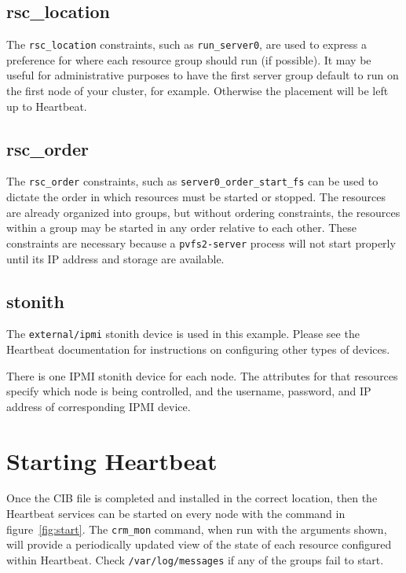 \documentclass[11pt]{article}
\begin{document}
\subsection{rsc\_location}

The \texttt{rsc\_location} constraints, such as \texttt{run\_server0},
are used to express a preference for where each resource group should
run (if possible).  It may be useful for administrative purposes to have
the first server group default to run on the first node of your cluster,
for example.  Otherwise the placement will be left up to Heartbeat.

\subsection{rsc\_order}

The \texttt{rsc\_order} constraints, such as
\texttt{server0\_order\_start\_fs} can be used to dictate the order in
which resources must be started or stopped.  The resources are already
organized into groups, but without ordering constraints, the resources
within a group may be started in any order relative to each other.
These constraints are necessary because a \texttt{pvfs2-server} process will not
start properly until its IP address and storage are available.

\subsection{stonith}

The \texttt{external/ipmi} stonith device is used in this example.
Please see the Heartbeat documentation for instructions on configuring
other types of devices.

There is one IPMI stonith device for each node.  The attributes for that
resources specify which node is being controlled, and the username,
password, and IP address of corresponding IPMI device.

\section{Starting Heartbeat}

Once the CIB file is completed and installed in the correct location,
then the Heartbeat services can be started on every node with the
command in figure~\ref{fig:start}.  The \texttt{crm\_mon} command, when
run with the arguments shown, will provide a periodically updated view
of the state of each resource configured within Heartbeat.  Check
\texttt{/var/log/messages} if any of the groups fail to start.
\end{document}
